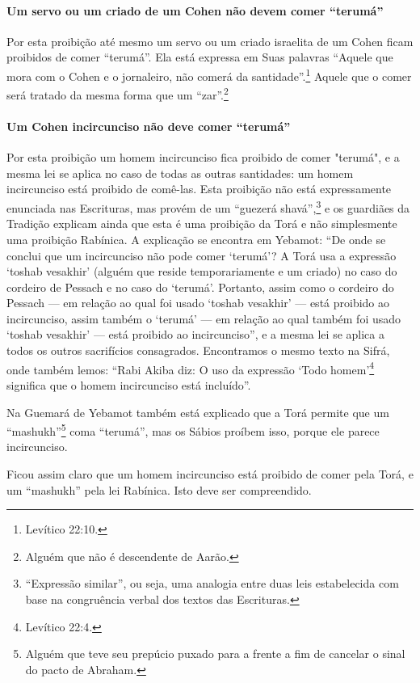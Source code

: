 \paragraph{Um servo ou um criado de um Cohen não devem comer ``terumá''}

Por esta proibição até mesmo um servo ou um criado israelita de um
Cohen ficam proibidos de comer ``terumá''. Ela está expressa em Suas
palavras ``Aquele que mora com o Cohen e o jornaleiro, não comerá da
santidade''.\footnote{Levítico 22:10.} Aquele que o comer será tratado da mesma
forma que um ``zar''.\footnote{Alguém que não é descendente de Aarão.}

\paragraph{Um Cohen incircunciso não deve comer ``terumá''}

Por esta proibição um homem incircunciso fica proibido de comer
"terumá", e a mesma lei se aplica no caso de todas as outras santidades:
um homem incircunciso está proibido de comê-las. Esta proibição não está
expressamente enunciada nas Escrituras, mas provém de um ``guezerá
shavá'',\footnote{``Expressão similar'', ou seja, uma analogia entre duas leis
  estabelecida com base na congruência verbal dos textos das Escrituras.} e os guardiães da Tradição explicam ainda
que esta é uma proibição da Torá e não simplesmente uma proibição
Rabínica. A explicação se encontra em Yebamot: ``De onde se conclui que
um incircunciso não pode comer `terumá'? A Torá usa a expressão `toshab
vesakhir' (alguém que reside temporariamente e um criado) no caso do
cordeiro de Pessach e no caso do `terumá'. Portanto, assim como o
cordeiro do Pessach --- em relação ao qual foi usado `toshab vesakhir'
--- está proibido ao incircunciso, assim também o `terumá' --- em
relação ao qual também foi usado `toshab vesakhir' --- está proibido ao
incircunciso'', e a mesma lei se aplica a todos os outros sacrifícios
consagrados. Encontramos o mesmo texto na Sifrá, onde também lemos:
``Rabi Akiba diz: O uso da expressão `Todo homem'\footnote{Levítico 22:4.}
significa que o homem incircunciso está incluído''.

Na Guemará de Yebamot também está explicado que a Torá permite que um
``mashukh''\footnote{Alguém que teve seu prepúcio puxado para a frente a fim de cancelar o sinal do pacto de Abraham.} coma ``terumá'', mas os Sábios proíbem
isso, porque ele parece incircunciso.

Ficou assim claro que um homem incircunciso está proibido de comer pela
Torá, e um ``mashukh'' pela lei Rabínica. Isto deve ser compreendido.

